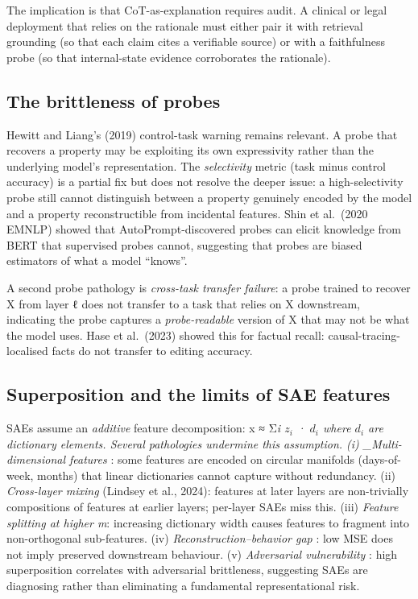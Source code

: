 \documentclass{article}
\begin{document}
The implication is that CoT-as-explanation requires audit. A clinical or legal deployment that relies on the rationale must either pair it with retrieval grounding (so that each claim cites a verifiable source) or with a faithfulness probe (so that internal-state evidence corroborates the rationale).

\subsection{The brittleness of probes}\label{the-brittleness-of-probes}

Hewitt and Liang's (2019) control-task warning remains relevant. A probe that recovers a property may be exploiting its own expressivity rather than the underlying model's representation. The \emph{selectivity} metric (task minus control accuracy) is a partial fix but does not resolve the deeper issue: a high-selectivity probe still cannot distinguish between a property genuinely encoded by the model and a property reconstructible from incidental features. Shin et al.~(2020 EMNLP) showed that AutoPrompt-discovered probes can elicit knowledge from BERT that supervised probes cannot, suggesting that probes are biased estimators of what a model ``knows''.

A second probe pathology is \emph{cross-task transfer failure}: a probe trained to recover X from layer ℓ does not transfer to a task that relies on X downstream, indicating the probe captures a \emph{probe-readable} version of X that may not be what the model uses. Hase et al.~(2023) showed this for factual recall: causal-tracing-localised facts do not transfer to editing accuracy.

\subsection{Superposition and the limits of SAE features}\label{superposition-and-the-limits-of-sae-features}

SAEs assume an \emph{additive} feature decomposition: x ≈ Σ\emph{i \(z_i\) · \(d_i\) where \(d_i\) are dictionary elements. Several pathologies undermine this assumption. (i) \_Multi-dimensional features} \citep{engels2024notalllanguagemode}: some features are encoded on circular manifolds (days-of-week, months) that linear dictionaries cannot capture without redundancy. (ii) \emph{Cross-layer mixing} (Lindsey et al., 2024): features at later layers are non-trivially compositions of features at earlier layers; per-layer SAEs miss this. (iii) \emph{Feature splitting at higher m}: increasing dictionary width causes features to fragment into non-orthogonal sub-features. (iv) \emph{Reconstruction--behavior gap} \citep{braun2024identifyingfunctio}: low MSE does not imply preserved downstream behaviour. (v) \emph{Adversarial vulnerability} \citep{bereska2024mechanisticinterpr}: high superposition correlates with adversarial brittleness, suggesting SAEs are diagnosing rather than eliminating a fundamental representational risk.
\end{document}
